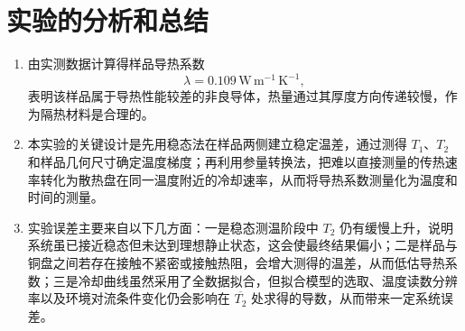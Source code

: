 \documentclass{../template/myrpt}
\begin{document}
\section{实验的分析和总结}
\begin{enumerate}[label=\arabic*. ]
  \item 由实测数据计算得样品导热系数
  \[
    \lambda = 0.109\,\mathrm{W\,m^{-1}\,K^{-1}},
  \]
  表明该样品属于导热性能较差的非良导体，热量通过其厚度方向传递较慢，作为隔热材料是合理的。
  \item 本实验的关键设计是先用稳态法在样品两侧建立稳定温差，通过测得 $T_1$、$T_2$ 和样品几何尺寸确定温度梯度；再利用参量转换法，把难以直接测量的传热速率转化为散热盘在同一温度附近的冷却速率，从而将导热系数测量化为温度和时间的测量。
  \item 实验误差主要来自以下几方面：一是稳态测温阶段中 $T_2$ 仍有缓慢上升，说明系统虽已接近稳态但未达到理想静止状态，这会使最终结果偏小；二是样品与铜盘之间若存在接触不紧密或接触热阻，会增大测得的温差，从而低估导热系数；三是冷却曲线虽然采用了全数据拟合，但拟合模型的选取、温度读数分辨率以及环境对流条件变化仍会影响在 $\overline{T_2}$ 处求得的导数，从而带来一定系统误差。
\end{enumerate}

\insertSignedDataPage
\end{document}
